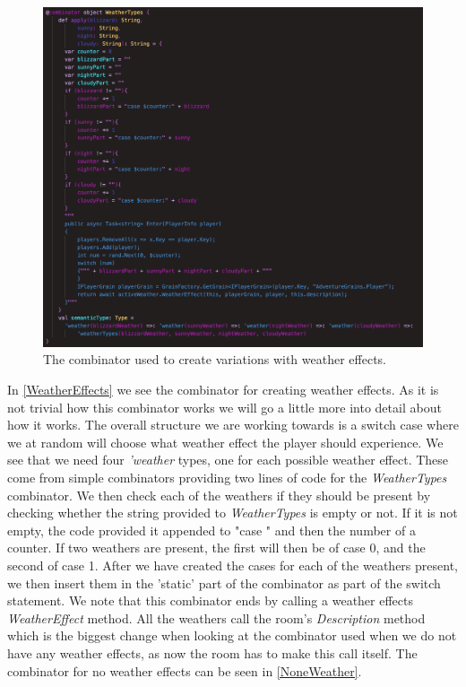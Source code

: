 \begin{figure}[H]
	\centering
	\includegraphics[width=\linewidth]{Materials/Decomposition/Room/WeatherEffects}
	\caption{The combinator used to create variations with weather effects.}
	\label{WeatherEffects}
\end{figure}
In \autoref{WeatherEffects} we see the combinator for creating weather effects. As it is not trivial how this combinator works we will go a little more into detail about how it works. The overall structure we are working towards is a switch case where we at random will choose what weather effect the player should experience. We see that we need four \textit{'weather} types, one for each possible weather effect. These come from simple combinators providing two lines of code for the \textit{WeatherTypes} combinator. We then check each of the weathers if they should be present by checking whether the string provided to \textit{WeatherTypes} is empty or not. If it is not empty, the code provided it appended to "case " and then the number of a counter. If two weathers are present, the first will then be of case 0, and the second of case 1. After we have created the cases for each of the weathers present, we then insert them in the 'static' part of the combinator as part of the switch statement. We note that this combinator ends by calling a weather effects \textit{WeatherEffect} method. All the weathers call the room's \textit{Description} method which is the biggest change when looking at the combinator used when we do not have any weather effects, as now the room has to make this call itself. The combinator for no weather effects can be seen in \autoref{NoneWeather}.

